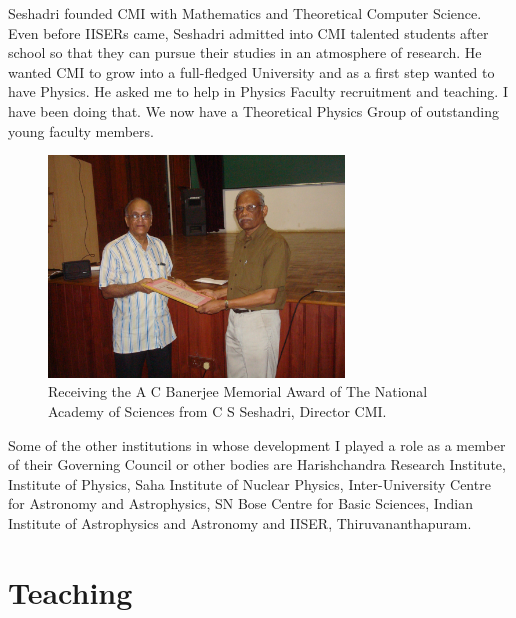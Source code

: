 Seshadri founded CMI with Mathematics and Theoretical Computer Science. 
Even before IISERs came, Seshadri admitted into CMI talented students 
after school so that they can pursue their studies in an atmosphere of 
research. He wanted CMI to grow into a full-fledged University and as a 
first step wanted to have Physics. He asked me to help in Physics 
Faculty recruitment and teaching. I have been doing that. We now have a 
Theoretical Physics Group of outstanding young faculty members.
\begin{figure}[h]
\centering
\includegraphics[width=0.7\textwidth]{images/Rajaji-seshadri.jpg}
\caption{Receiving the A C Banerjee Memorial Award of The
National Academy of Sciences from C S Seshadri, Director CMI.}
\end{figure}

Some of the other institutions in whose development I played a role as a 
member of their Governing Council or other bodies are Harishchandra 
Research Institute, Institute of Physics, Saha Institute of Nuclear 
Physics, Inter-University Centre for Astronomy and Astrophysics, SN Bose 
Centre for Basic Sciences, Indian Institute of Astrophysics and 
Astronomy and IISER, Thiruvananthapuram.

\section*{Teaching}

